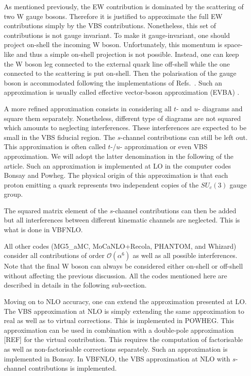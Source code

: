 As mentioned previously, the EW contribution is dominated by the scattering of two W gauge bosons.
Therefore it is justified to approximate the full EW contributions simply by the VBS contributions.
Nonetheless, this set of contributions is not gauge invariant.
To make it gauge-invariant, one should project on-shell the incoming W boson.
Unfortunately, this momentum is space-like and thus a simple on-shell projection is not possible.
Instead, one can keep the W boson leg connected to the external quark line off-shell while the one connected to the scattering is put on-shell.
Then the polarisation of the gauge boson is accommodated following the implementations of Refs.~\cite{Kuss:1995yv,Accomando:2006hq}.
Such an approximation is usually called effective vector-boson approximation (EVBA) \cite{Dawson:1984gx,Duncan:1985vj,Cahn:1983ip}.

A more refined approximation consists in considering all $t$- and $u$- diagrams and square them separately.
Nonetheless, different type of diagrams are not squared which amounts to neglecting interferences.
These interferences are expected to be small in the VBS fiducial region.
The $s$-channel contributions can still be left out.
This approximation is often called $t$-/$u$- approximation or even VBS approximation.
We will adopt the latter denomination in the following of the article.
Such an approximation is implemented at LO in the computer codes {\sc Bonsay} and {\sc Powheg}.
The physical origin of this approximation is that each proton emitting a quark represents two independent copies of the $SU_c\left(3\right)$ gauge group.

The squared matrix element of the $s$-channel contributions can then be added but all interferences between different kinematic channels are neglected.
This is what is done in {\sc VBFNLO}.

All other codes ({\sc MG5\_aMC}, {\sc MoCaNLO+Recola}, {\sc PHANTOM}, and {\sc Whizard}) consider all contributions of order $\mathcal{O}{\left(\alpha^{6}\right)}$ as well as all possible interferences.
Note that the final W boson can always be considered either on-shell or off-shell without affecting the previous discussion.
All the codes mentioned here are described in details in the following sub-section.

Moving on to NLO accuracy, one can extend the approximation presented at LO.
The VBS approximation at NLO is simply extending the same approximation to real as well as to virtual corrections.
This is implemented in {\sc POWHEG}.
This approximation can be used in combination with a double-pole approximation [REF] for the virtual contribution.
This requires the computation of factorisable as well as non-factorisable corrections \cite{Dittmaier:2015bfe} separately.
Such an approximation is implemented in {\sc Bonsay}.
In {\sc VBFNLO}, the VBS approximation at NLO with $s$-channel contributions is implemented.

